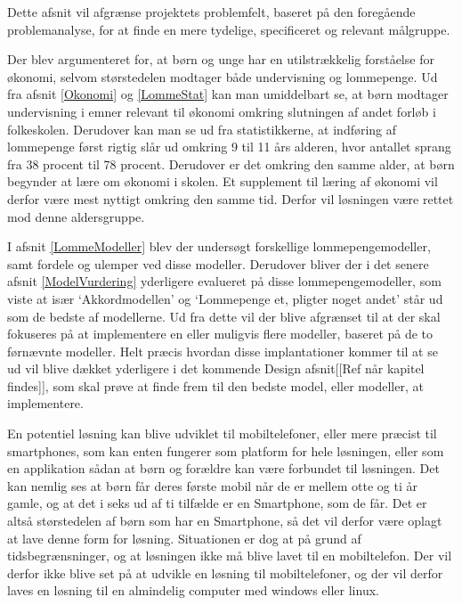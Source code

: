 Dette afsnit vil afgrænse projektets problemfelt, baseret på den foregående problemanalyse, for at finde en mere tydelige, specificeret og relevant målgruppe.

Der blev argumenteret for, at børn og unge har en utilstrækkelig forståelse for økonomi, selvom størstedelen modtager både undervisning og lommepenge. Ud fra afsnit \ref{Okonomi}  og \ref{LommeStat}  kan man umiddelbart se, at børn modtager undervisning i emner relevant til økonomi omkring slutningen af andet forløb i folkeskolen. Derudover kan man se ud fra statistikkerne, at indføring af lommepenge først rigtig slår ud omkring 9 til 11 års alderen, hvor antallet sprang fra 38 procent til 78 procent. Derudover er det omkring den samme alder, at børn begynder at lære om økonomi i skolen. Et supplement til læring af økonomi vil derfor være mest nyttigt omkring den samme tid. Derfor vil løsningen være rettet mod denne aldersgruppe.

I afsnit \ref{LommeModeller} blev der undersøgt forskellige lommepengemodeller, samt fordele og ulemper ved disse modeller. Derudover bliver der i det senere afsnit \ref{ModelVurdering} yderligere evalueret på disse lommepengemodeller, som viste at især ‘Akkordmodellen’ og ‘Lommepenge et, pligter noget andet’ står ud som de bedste af modellerne. Ud fra dette vil der blive afgrænset til at der skal fokuseres på at implementere en eller muligvis flere modeller, baseret på de to førnævnte modeller. Helt præcis hvordan disse implantationer kommer til at se ud vil blive dækket yderligere i det kommende Design afsnit[[Ref når kapitel findes]], som skal prøve at finde frem til den bedste model, eller modeller, at implementere.

En potentiel løsning kan blive udviklet til mobiltelefoner, eller mere præcist til smartphones, som kan enten fungerer som platform for hele løsningen, eller som en applikation sådan at børn og forældre kan være forbundet til løsningen. Det kan nemlig ses at børn får deres første mobil når de er mellem otte og ti år gamle, og at det i seks ud af ti tilfælde er en Smartphone, som de får\cite{BornSmart}. Det er altså størstedelen af børn som har en Smartphone, så det vil derfor være oplagt at lave denne form for løsning. Situationen er dog at på grund af tidsbegrænsninger, og at løsningen ikke må blive lavet til en mobiltelefon. Der vil derfor ikke blive set på at udvikle en løsning til mobiltelefoner, og der vil derfor laves en løsning til en almindelig computer med windows eller linux.

